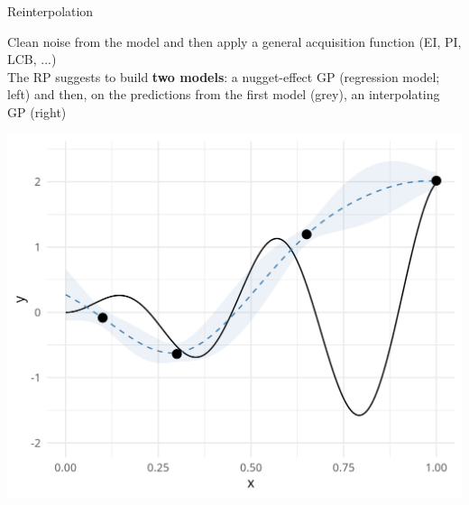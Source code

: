 \documentclass[11pt,compress,t,notes=noshow, xcolor=table]{beamer}
\begin{document}
\begin{frame}{Reinterpolation}

 {
Clean noise from the model and then apply a general acquisition function (EI, PI, LCB, ...)\\
\vspace{1em}
The RP suggests to build \textbf{two models}: a nugget-effect GP (regression model; left) and then, on the predictions from the first model (grey), an interpolating GP (right)
}
 {
\begin{algorithm}[H]
\footnotesize
  \caption{Reinterpolation Procedure}
  \begin{algorithmic}[1]
  \end{algorithmic}
\end{algorithm}
}
\vfill
\begin{minipage}[b]{0.45\textwidth}
  \includegraphics[width = \textwidth]{figure_man/noisy_2.png}
\end{minipage}
\hfill
\begin{minipage}[b]{0.45\textwidth}

\end{minipage}
\end{frame}
\end{document}
